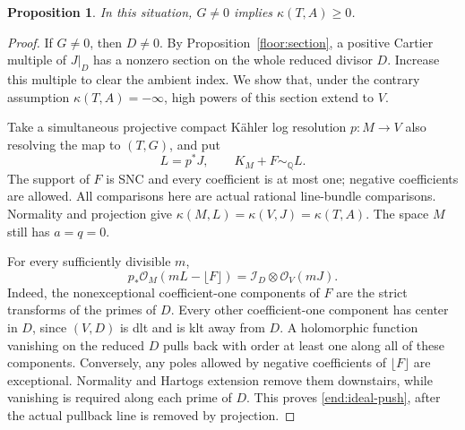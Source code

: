 \documentclass[11pt,letterpaper]{article}
\newcommand{\Q}{\mathbb{Q}}
\newcommand{\OO}{\mathcal{O}}
\newtheorem{proposition}[theorem]{Proposition}
\theoremstyle{definition}
\theoremstyle{remark}
\begin{document}
\begin{proposition}\label{end:boundary-nonvanishing}
In this situation, \(G\ne0\) implies \(\kappa(T,A)\ge0\).
\end{proposition}

\begin{proof}
If \(G\ne0\), then \(D\ne0\). By
Proposition~\ref{floor:section}, a positive Cartier multiple of
\(J|_D\) has a nonzero section on the whole reduced divisor
\(D\). Increase this multiple to clear the ambient index. We show
that, under the contrary assumption \(\kappa(T,A)=-\infty\),
high powers of this section extend to \(V\).

Take a simultaneous projective compact K\"ahler log resolution
\(p:M\to V\) also resolving the map to \((T,G)\), and put
\begin{equation}\label{end:crepant}
 L=p^*J,\qquad K_M+F\sim_{\Q}L.
\end{equation}
The support of \(F\) is SNC and every coefficient is at most one;
negative coefficients are allowed. All comparisons here are actual
rational line-bundle comparisons. Normality and projection give
\(\kappa(M,L)=\kappa(V,J)=\kappa(T,A)\). The space \(M\)
still has \(a=q=0\).

For every sufficiently divisible \(m\),
\begin{equation}\label{end:ideal-push}
 p_*\OO_M(mL-\lfloor F\rfloor)
   =\mathcal I_D\otimes\OO_V(mJ).
\end{equation}
Indeed, the nonexceptional coefficient-one components of \(F\)
are the strict transforms of the primes of \(D\). Every other
coefficient-one component has center in \(D\), since \((V,D)\)
is dlt and is klt away from \(D\). A holomorphic function vanishing
on the reduced \(D\) pulls back with order at least one along all
of these components. Conversely, any poles allowed by negative
coefficients of \(\lfloor F\rfloor\) are exceptional. Normality
and Hartogs extension remove them downstairs, while vanishing is
required along each prime of \(D\). This proves
\eqref{end:ideal-push}, after the actual pullback line is removed
by projection.


\end{proof}
\end{document}
